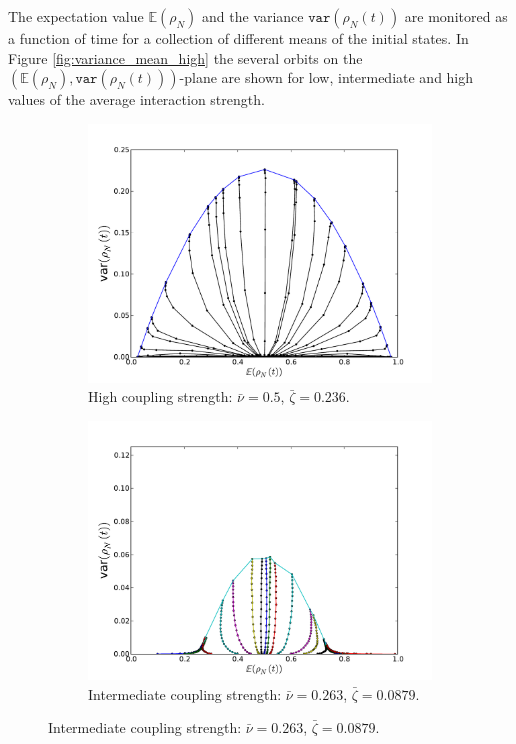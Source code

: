 \documentclass[]{article}
\begin{document}
The expectation value $\mathbb{E}(\rho_N)$ and the variance $\texttt{var}(\rho_N(t))$ are monitored as a function of time for a collection of different means of the initial states. In Figure \ref{fig:variance_mean_high} the several orbits on the $(\mathbb{E}(\rho_N),\texttt{var}(\rho_N(t)))$-plane are shown for low, intermediate and high values of the average interaction strength.  



\begin{figure}
\centering
\begin{subfigure}[b]{0.7\textwidth}
\includegraphics[width=\textwidth]{variance_mean_N1000_M500_fully_connected_20timesteps.pdf}
\caption{High coupling strength:  $\bar{\nu}=0.5$, $\bar{\zeta}=0.236$.}
\label{fig:fig:variance_mean_high}
\end{subfigure}

\begin{subfigure}[b]{0.7\textwidth}
\includegraphics[width=\textwidth]{variance_mean_N1000_M500_intermediate_fully_20timesteps.pdf}
\caption{ Intermediate coupling strength: $\bar{\nu}=0.263$, $\bar{\zeta}=0.0879$.}
\label{fig:fig:variance_mean_inter}
\end{subfigure}


\end{figure}
\end{document}
